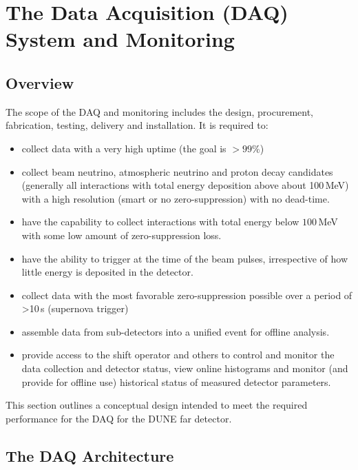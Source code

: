 
\section{The Data Acquisition (DAQ) System and Monitoring}
\label{sec:daq}

\subsection{Overview}

The scope of the DAQ and monitoring includes the design, procurement,
fabrication, testing, delivery and installation. It is required to:
\begin{itemize}
\item collect data with a very high uptime (the goal is $> 99\%$)
\item collect beam neutrino, atmospheric neutrino and proton
  decay candidates (generally all interactions with total energy deposition
  above about 100\,MeV) with a high resolution (smart or no
  zero-suppression) with no dead-time.
\item have the capability to collect interactions with total energy
  below $100$\,MeV with some
 low amount of zero-suppression loss.
\item have the ability to trigger at the time of the beam pulses,
  irrespective of how little energy is deposited in the detector.
\item collect data with the most favorable zero-suppression possible over a
  period of >10\,s (supernova trigger)
\item assemble data from sub-detectors into a unified
  event for offline analysis.
\item provide access to the shift operator and others to control and
  monitor the data collection and detector status, view online
  histograms and monitor (and provide for offline use) historical
  status of measured detector parameters. 
\end{itemize}
This section outlines a conceptual design intended to meet the required performance for the DAQ
for the DUNE far detector. 


\subsection{The DAQ Architecture}

